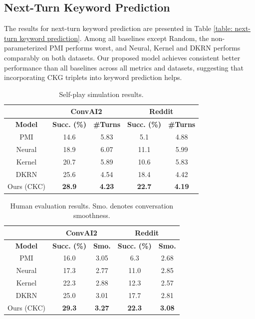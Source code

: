 \documentclass[letterpaper]{article} %
\begin{document}
\subsection{Next-Turn Keyword Prediction}
\label{sec: next-turn keyword prediction}

The results for next-turn keyword prediction are presented in Table \ref{table: next-turn keyword prediction}. Among all baselines except Random, the non-parameterized PMI performs worst, and Neural, Kernel and DKRN performs comparably on both datasets. Our proposed model achieves consistent better performance than all baselines across all metrics and datasets, suggesting that incorporating CKG triplets into keyword prediction helps. 
\begin{table}[!t]
\small
\centering
\begin{tabular}{c|cc|cc}
\hline
&\multicolumn{2}{c|}{\textbf{ConvAI2}}&\multicolumn{2}{c}{\textbf{Reddit}}\\
\hline
\textbf{Model} & \textbf{Succ. (\%)} & \textbf{\#Turns} & \textbf{Succ. (\%)} & \textbf{\#Turns}\\
\hline
PMI & 14.6 & 5.83 & 5.1 & 4.88\\
Neural & 18.9 & 6.07 & 11.1 & 5.99\\
Kernel & 20.7 & 5.89 & 10.6 & 5.83\\
DKRN & 25.6 & 4.54 & 18.4 & 4.42\\
\hline
Ours (CKC) & \textbf{28.9} & \textbf{4.23} & \textbf{22.7} & \textbf{4.19}\\
\hline
\end{tabular}
\caption{Self-play simulation results.}
\label{table: self-play}
\end{table}
\begin{table}[!t]
\small
\centering
\begin{tabular}{c|cc|cc}
\hline
&\multicolumn{2}{c|}{\textbf{ConvAI2}}&\multicolumn{2}{c}{\textbf{Reddit}}\\
\hline
\textbf{Model} & \textbf{Succ. (\%)} & \textbf{Smo.} & \textbf{Succ. (\%)} & \textbf{Smo.}\\
\hline
PMI & 16.0 & 3.05 & 6.3 & 2.68\\
Neural & 17.3 & 2.77 & 11.0 & 2.85\\
Kernel & 22.3 & 2.88 & 12.3 & 2.57\\
DKRN & 25.0 & 3.01 & 17.7 & 2.81\\
\hline
Ours (CKC) & \textbf{29.3} & \textbf{3.27} & \textbf{22.3} & \textbf{3.08}\\
\hline
\end{tabular}
\caption{Human evaluation results. Smo. denotes conversation smoothness.}
\label{table: human evaluation}
\end{table}
\end{document}
